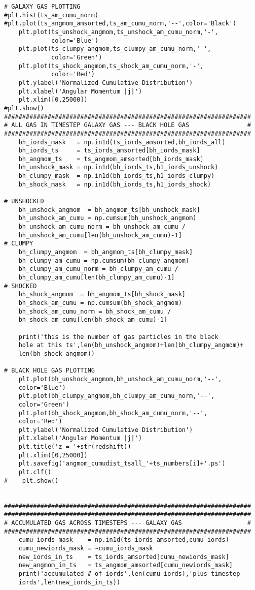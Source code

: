 \documentclass[12pt,headA,chapB]{fiskthesis}
\begin{document}
\begin{verbatim}
# GALAXY GAS PLOTTING
#plt.hist(ts_am_cumu_norm)
#plt.plot(ts_angmom_amsorted,ts_am_cumu_norm,'--',color='Black') 
    plt.plot(ts_unshock_angmom,ts_unshock_am_cumu_norm,'-',
             color='Blue')
    plt.plot(ts_clumpy_angmom,ts_clumpy_am_cumu_norm,'-',
             color='Green')
    plt.plot(ts_shock_angmom,ts_shock_am_cumu_norm,'-',
             color='Red')
    plt.ylabel('Normalized Cumulative Distribution')
    plt.xlabel('Angular Momentum |j|')
    plt.xlim([0,25000])
#plt.show()
####################################################################
# ALL GAS IN TIMESTEP GALAXY GAS --- BLACK HOLE GAS                #
####################################################################
    bh_iords_mask   = np.in1d(ts_iords_amsorted,bh_iords_all)
    bh_iords_ts     = ts_iords_amsorted[bh_iords_mask]
    bh_angmom_ts    = ts_angmom_amsorted[bh_iords_mask]
    bh_unshock_mask = np.in1d(bh_iords_ts,h1_iords_unshock)
    bh_clumpy_mask  = np.in1d(bh_iords_ts,h1_iords_clumpy)
    bh_shock_mask   = np.in1d(bh_iords_ts,h1_iords_shock)
    
# UNSHOCKED
    bh_unshock_angmom  = bh_angmom_ts[bh_unshock_mask]
    bh_unshock_am_cumu = np.cumsum(bh_unshock_angmom)
    bh_unshock_am_cumu_norm = bh_unshock_am_cumu / 
    bh_unshock_am_cumu[len(bh_unshock_am_cumu)-1]
# CLUMPY
    bh_clumpy_angmom  = bh_angmom_ts[bh_clumpy_mask]
    bh_clumpy_am_cumu = np.cumsum(bh_clumpy_angmom)
    bh_clumpy_am_cumu_norm = bh_clumpy_am_cumu / 
    bh_clumpy_am_cumu[len(bh_clumpy_am_cumu)-1]
# SHOCKED
    bh_shock_angmom  = bh_angmom_ts[bh_shock_mask]
    bh_shock_am_cumu = np.cumsum(bh_shock_angmom)
    bh_shock_am_cumu_norm = bh_shock_am_cumu / 
    bh_shock_am_cumu[len(bh_shock_am_cumu)-1]

    print('this is the number of gas particles in the black 
    hole at this ts',len(bh_unshock_angmom)+len(bh_clumpy_angmom)+
    len(bh_shock_angmom))

# BLACK HOLE GAS PLOTTING
    plt.plot(bh_unshock_angmom,bh_unshock_am_cumu_norm,'--',
    color='Blue')
    plt.plot(bh_clumpy_angmom,bh_clumpy_am_cumu_norm,'--',
    color='Green')
    plt.plot(bh_shock_angmom,bh_shock_am_cumu_norm,'--',
    color='Red')
    plt.ylabel('Normalized Cumulative Distribution')
    plt.xlabel('Angular Momentum |j|')
    plt.title('z = '+str(redshift))
    plt.xlim([0,25000])
    plt.savefig('angmom_cumudist_tsall_'+ts_numbers[i]+'.ps')
    plt.clf()
#    plt.show()


####################################################################
####################################################################
# ACCUMULATED GAS ACROSS TIMESTEPS --- GALAXY GAS                  #
####################################################################
    cumu_iords_mask    = np.in1d(ts_iords_amsorted,cumu_iords)
    cumu_newiords_mask = ~cumu_iords_mask
    new_iords_in_ts    = ts_iords_amsorted[cumu_newiords_mask]
    new_angmom_in_ts   = ts_angmom_amsorted[cumu_newiords_mask]
    print('accumulated # of iords',len(cumu_iords),'plus timestep 
    iords',len(new_iords_in_ts))


\end{verbatim}
\end{document}

